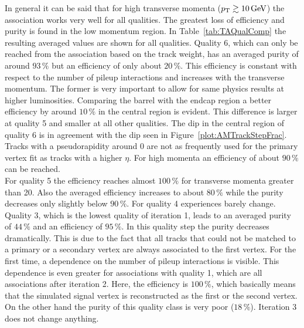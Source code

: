 In general it can be said that for high transverse momenta ($p_{\mathrm{T}}{}\gtrsim{}10\,\text{Ge\hspace{-.08em}V}{}$) the association works very well for all qualities. The greatest loss of efficiency and purity is found in the low momentum region. In Table~\ref{tab:TAQualComp} the resulting averaged values are shown for all qualities. Quality 6, which can only be reached from the association based on the track weight, has an averaged purity of around $93\,\%$ but an efficiency of only about $20\,\%$. This efficiency is constant with respect to the number of pileup interactions and increases with the transverse momentum. The former is very important to allow for same physics results at higher luminosities. Comparing the barrel with the endcap region a better efficiency by around $10\,\%$ in the central region is evident. This difference is larger at quality 5 and smaller at all other qualities. The dip in the central region of quality 6 is in agreement with the dip seen in Figure~\ref{plot:AMTrackStepFrac}. Tracks with a pseudorapidity around 0 are not as frequently used for the primary vertex fit as tracks with a higher $\eta{}$. For high momenta an efficiency of about $90\,\%$ can be reached. \\
For quality 5 the efficiency reaches almost $100\,\%$ for transverse momenta greater than 20\GeV. Also the averaged efficiency increases to about $80\,\%$  while the purity decreases only slightly below $90\,\%$. For quality 4 experiences barely change. Quality 3, which is the lowest quality of iteration 1, leads to an averaged purity of $44\,\%$ and an efficiency of $95\,\%$. In this quality step the purity decreases dramatically. This is due to the fact that all tracks that could not be matched to a primary or a secondary vertex are always associated to the first vertex. For the first time, a dependence on the number of pileup interactions is visible. This dependence is even greater for associations with quality 1, which are all associations after iteration 2. Here, the efficiency is $100\,\%$, which basically means that the simulated signal vertex is reconstructed as the first or the second vertex. On the other hand the purity of this quality class is very poor ($18\,\%$). Iteration 3 does not change anything.


